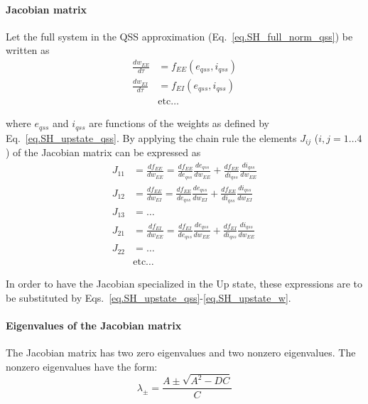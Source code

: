 \documentclass[
twocolumn,
]{article}
\newcommand{\EE}{\mathit{EE}}
\newcommand{\EI}{\mathit{EI}}
\newcommand{\qss}{\mathit{qss}}
\begin{document}
\paragraph{Jacobian matrix}

Let the full system in the QSS approximation (Eq.\ \ref{eq.SH_full_norm_qss}) be written as
\begin{displaymath}
\begin{aligned}
\frac{dw_{\EE}}{d\tau} & = f_{\EE}(e_{\qss},i_{\qss}) \\
\frac{dw_{\EI}}{d\tau} & = f_{\EI}(e_{\qss},i_{\qss}) \\
& \mbox{etc}\ldots
\end{aligned}
\end{displaymath}

\noindent where $e_{\qss}$ and $i_{\qss}$ are functions of the weights as defined by Eq.\ \ref{eq.SH_upstate_qss}. By applying the chain rule the elements $J_{ij}$ ($i,j=1\ldots4$) of the Jacobian matrix can be expressed as
\begin{displaymath}
\begin{aligned}
J_{11} & = \frac{df_{\EE}}{dw_{\EE}} = \frac{df_{\EE}}{de_{\qss}} \frac{de_{\qss}}{dw_{\EE}} + \frac{df_{\EE}}{di_{\qss}} \frac{di_{\qss}}{dw_{\EE}} \\
J_{12} & = \frac{df_{\EE}}{dw_{\EI}} = \frac{df_{\EE}}{de_{\qss}} \frac{de_{\qss}}{dw_{\EI}} + \frac{df_{\EE}}{di_{\qss}} \frac{di_{\qss}}{dw_{\EI}} \\
J_{13} & = \ldots \\
J_{21} & = \frac{df_{\EI}}{dw_{\EE}} = \frac{df_{\EI}}{de_{\qss}} \frac{de_{\qss}}{dw_{\EE}} + \frac{df_{\EI}}{di_{\qss}} \frac{di_{\qss}}{dw_{\EE}} \\
J_{22} & = \ldots \\
& \mbox{etc}\ldots
\end{aligned}
\end{displaymath}

In order to have the Jacobian specialized in the Up state, these expressions are to be substituted by Eqs.\ \ref{eq.SH_upstate_qss}-\ref{eq.SH_upstate_w}.



\paragraph{Eigenvalues of the Jacobian matrix}

The Jacobian matrix has two zero eigenvalues and two nonzero eigenvalues. The nonzero eigenvalues have the form:
\begin{equation}
\lambda_{\pm} = \frac{A \pm \sqrt{A^2 - DC}}{C}
\label{eq.SH_eigvals}
\end{equation}
\end{document}
